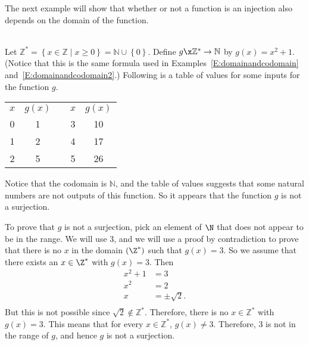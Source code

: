\begin{center}
\end{center}
The next example will show that whether or not a function is an injection also depends on the domain of the function.
%
\begin{example}\label{E:domainandcodomain3}  \hfill \\
Let  
$\mathbb{Z}^*  = \left\{ { {x \in \mathbb{Z}} \mid x \geq 0} \right\} = \mathbb{N} \cup \left\{ 0 \right\}$.  Define  $g\x \mathbb{Z}^*  \to \mathbb{N}$ by  
$g( x ) = x^2  + 1$.  (Notice that this is the same formula used in Examples~\ref{E:domainandcodomain} and~\ref{E:domainandcodomain2}.)  Following is a table of values for some inputs for the function  $g$.

\begin{center}
\begin{tabular}{ c | c  c  c | c}
  $x$ &  $g ( x )$ &   &  $x$ &  $g ( x )$ \\ \cline{1-2} \cline{4-5}
   0 &            1           &   &   3  &       10               \\ \cline{1-2} \cline{4-5}
   1 &            2           &   &   4  &       17               \\ \cline{1-2} \cline{4-5}
   2 &            5           &   &   5  &       26               \\ \cline{1-2} \cline{4-5}
\end{tabular}
\end{center}
Notice that the codomain is  $\mathbb{N}$, and the table of values suggests that some natural numbers are not outputs of this function.  So it appears that the function  $g$  is not a surjection.

To prove that   $g$  is not a surjection, pick an element of  $\N$  that does not appear to be in the range.  We will use  3, and we will use a proof by contradiction to prove that there is no $x$ in the domain $\left( \Z^*\right)$ such that  
$g( x ) = 3$.  So we assume that there exists an $x \in \Z^* $ with  $g( x ) = 3$.  Then
\begin{align*}
  x^2  + 1 &= 3 \\ 
       x^2 &= 2 \\ 
         x &=  \pm \sqrt 2.  \\ 
\end{align*}
But this is not possible since  $\sqrt 2  \notin \mathbb{Z}^* $.  Therefore, there is no 
$x \in \mathbb{Z}^* $ with  $g( x ) = 3$.  This means that for every  
$x \in \mathbb{Z}^* $,  $g( x ) \ne 3$.  Therefore,  3  is not in the range of  $g$,  and hence  $g$ is not a surjection.


\end{example}
